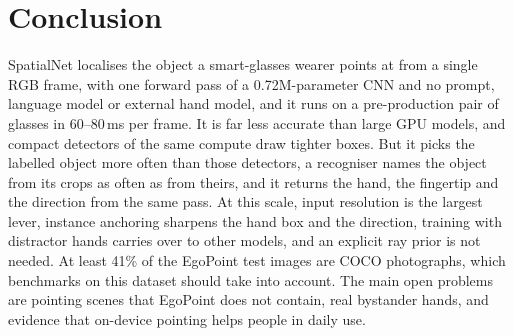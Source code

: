 \section{Conclusion}\label{sec:conclusion}
SpatialNet localises the object a smart-glasses wearer points at from a single RGB frame, with one forward pass of a 0.72M-parameter CNN and no prompt, language model or external hand model, and it runs on a pre-production pair of glasses in 60--80\,ms per frame. It is far less accurate than large GPU models, and compact detectors of the same compute draw tighter boxes. But it picks the labelled object more often than those detectors, a recogniser names the object from its crops as often as from theirs, and it returns the hand, the fingertip and the direction from the same pass. At this scale, input resolution is the largest lever, instance anchoring sharpens the hand box and the direction, training with distractor hands carries over to other models, and an explicit ray prior is not needed. At least 41\% of the EgoPoint test images are COCO photographs, which benchmarks on this dataset should take into account. The main open problems are pointing scenes that EgoPoint does not contain, real bystander hands, and evidence that on-device pointing helps people in daily use.
